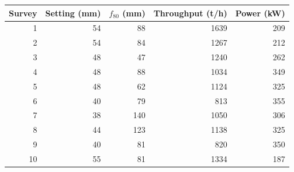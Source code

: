 \begin{tabular}{@{}rrrrr@{}}
\toprule
Survey & Setting (mm) & $f_{80}$ (mm) & Throughput (t/h) & Power (kW) \\
\midrule
1 & 54 & 88 & 1639 & 209 \\
2 & 54 & 84 & 1267 & 212 \\
3 & 48 & 47 & 1240 & 262 \\
4 & 48 & 88 & 1034 & 349 \\
5 & 48 & 62 & 1124 & 325 \\
6 & 40 & 79 & 813 & 355 \\
7 & 38 & 140 & 1050 & 306 \\
8 & 44 & 123 & 1138 & 325 \\
9 & 40 & 81 & 820 & 350 \\
10 & 55 & 81 & 1334 & 187 \\
\bottomrule
\end{tabular}
